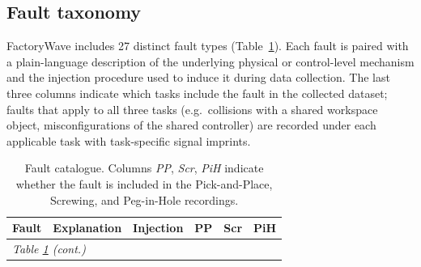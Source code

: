 \subsection{Fault taxonomy}

FactoryWave includes 27 distinct fault types (Table~\ref{tab:faults}). Each fault is paired with a plain-language description of the underlying physical or control-level mechanism and the injection procedure used to induce it during data collection. The last three columns indicate which tasks include the fault in the collected dataset; faults that apply to all three tasks (e.g.\ collisions with a shared workspace object, misconfigurations of the shared controller) are recorded under each applicable task with task-specific signal imprints.



    {\renewcommand{\arraystretch}{1.35}
        \begin{longtable}{@{}p{3.1cm}p{4.2cm}p{4.6cm}ccc@{}}
            \caption{Fault catalogue. Columns \textit{PP}, \textit{Scr}, \textit{PiH} indicate whether the fault is included in the Pick-and-Place, Screwing, and Peg-in-Hole recordings.}
            \label{tab:faults}                                                                                                                                                                                                                                                                                                                                                                                                                                                   \\
            \toprule
            Fault                             & Explanation                                                                                                                                                                                                     & Injection                                                                                                                                                               & PP         & Scr        & PiH        \\
            \midrule
            \endfirsthead
            \multicolumn{6}{l}{\small\textit{Table \ref{tab:faults} (cont.)}}                                                                                                                                                                                                                                                                                                                                                                                                    \\

\end{longtable}}
